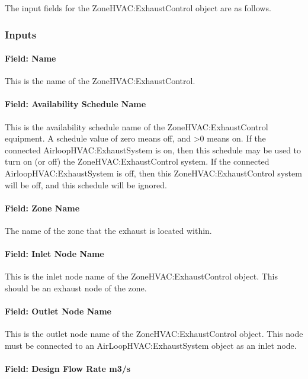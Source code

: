 The input fields for the ZoneHVAC:ExhaustControl object are as follows.

\subsubsection{Inputs}

\paragraph{Field: Name}

This is the name of the ZoneHVAC:ExhaustControl.

\paragraph{Field: Availability Schedule Name}

This is the availability schedule name of the ZoneHVAC:ExhaustControl equipment. A schedule value of zero means off, and >0 means on. If the connected AirloopHVAC:ExhaustSystem is on, then this schedule may be used to turn on (or off) the ZoneHVAC:ExhaustControl system. If the connected AirloopHVAC:ExhaustSystem is off, then this ZoneHVAC:ExhaustControl system will be off, and this schedule will be ignored.

\paragraph{Field: Zone Name}

The name of the zone that the exhaust is located within.

\paragraph{Field: Inlet Node Name}

This is the inlet node name of the ZoneHVAC:ExhaustControl object. This should be an exhaust node of the zone.

\paragraph{Field: Outlet Node Name}

This is the outlet node name of the ZoneHVAC:ExhaustControl object. This node must be connected to an AirLoopHVAC:ExhaustSystem object as an inlet node.

\paragraph{Field: Design Flow Rate {m3/s}}

